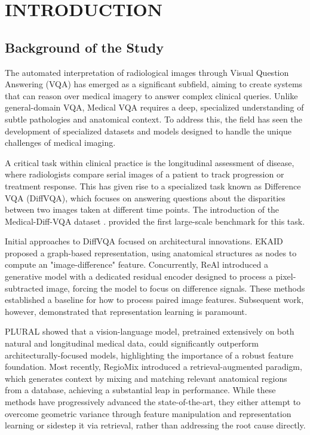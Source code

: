 \chapter{INTRODUCTION} 

\section{Background of the Study}

The automated interpretation of radiological images through Visual Question Answering (VQA) has emerged as a significant subfield, aiming to create systems that can reason over medical imagery to answer complex clinical queries. Unlike general-domain VQA, Medical VQA requires a deep, specialized understanding of subtle pathologies and anatomical context. To address this, the field has seen the development of specialized datasets and models designed to handle the unique challenges of medical imaging.

A critical task within clinical practice is the longitudinal assessment of disease, where radiologists compare serial images of a patient to track progression or treatment response. This has given rise to a specialized task known as Difference VQA (DiffVQA), which focuses on answering questions about the disparities between two images taken at different time points. The introduction of the Medical-Diff-VQA dataset \cite{medical-dff-vqa}. provided the first large-scale benchmark for this task.

Initial approaches to DiffVQA focused on architectural innovations. EKAID \cite{ekaid} proposed a graph-based representation, using anatomical structures as nodes to compute an "image-difference" feature. Concurrently, ReAl \cite{real} introduced a generative model with a dedicated residual encoder designed to process a pixel-subtracted image, forcing the model to focus on difference signals. These methods established a baseline for how to process paired image features. Subsequent work, however, demonstrated that representation learning is paramount.

PLURAL \cite{plural} showed that a vision-language model, pretrained extensively on both natural and longitudinal medical data, could significantly outperform architecturally-focused models, highlighting the importance of a robust feature foundation. Most recently, RegioMix \cite{regiomix} introduced a retrieval-augmented paradigm, which generates context by mixing and matching relevant anatomical regions from a database, achieving a substantial leap in performance. While these methods have progressively advanced the state-of-the-art, they either attempt to overcome geometric variance through feature manipulation and representation learning or sidestep it via retrieval, rather than addressing the root cause directly.


